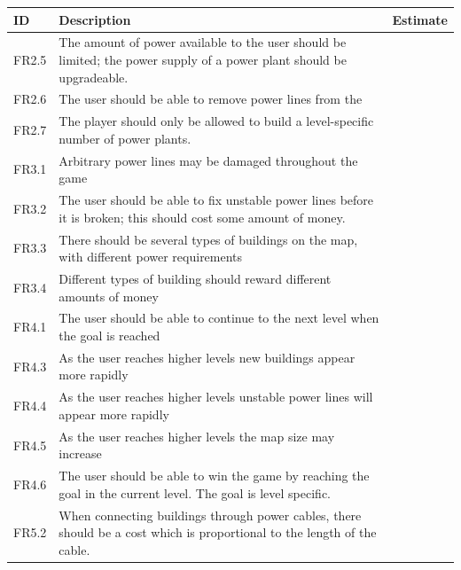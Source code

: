 	\begin{tabular}{| p{1.2cm} | p{8cm} | p{3cm} |}
		\hline
		\rowcolor{gray}
		ID & Description & Estimate \\ \hline

		FR2.5 & The amount of power available to the user should be limited; 
		the power supply of a power plant should be upgradeable. & \\ \hline

		FR2.6 & The user should be able to remove power lines from the 
		& \\ \hline

		FR2.7 & The player should only be allowed to build a level-specific 
		number of power plants. & \\ \hline

		FR3.1 & Arbitrary power lines may be damaged throughout the game & \\ \hline

		FR3.2 & The user should be able to fix unstable power lines before it is 
		broken; this should cost some amount of money. & \\ \hline

		FR3.3 & There should be several types of buildings on the map, with different 
		power requirements & \\ \hline

		FR3.4 & Different types of building should reward different amounts of 
		money & \\ \hline

		FR4.1 & The user should be able to continue to the next level when the goal is 
		reached & \\ \hline

		FR4.3 & As the user reaches higher levels new buildings appear more 
		rapidly & \\ \hline

		FR4.4 & As the user reaches higher levels unstable power lines will appear 
		more rapidly & \\ \hline

		FR4.5 & As the user reaches higher levels the map size may increase & \\ \hline

		FR4.6 & The user should be able to win the game by reaching the goal in 
		the current level. The goal is level specific. & \\ \hline

		FR5.2 & When connecting buildings through power cables, there should be a 
		cost which is proportional to the length of the cable. & \\ \hline


\end{tabular}

